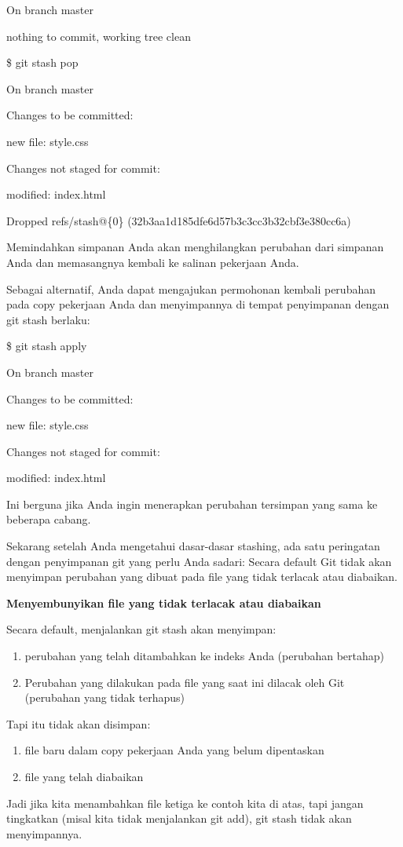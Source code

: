 On branch master

nothing to commit, working tree clean

\$ git stash pop

On branch master

Changes to be committed:

new file: style.css

Changes not staged for commit:

modified: index.html

Dropped refs/stash@\{0\} (32b3aa1d185dfe6d57b3c3cc3b32cbf3e380cc6a)

Memindahkan simpanan Anda akan menghilangkan perubahan dari simpanan 
Anda dan memasangnya kembali ke salinan pekerjaan Anda.



Sebagai alternatif, Anda dapat mengajukan permohonan kembali perubahan 
pada copy pekerjaan Anda dan menyimpannya di tempat penyimpanan dengan 
git stash berlaku:

\$ git stash apply

On branch master

Changes to be committed:

new file: style.css

Changes not staged for commit:

modified: index.html

Ini berguna jika Anda ingin menerapkan perubahan tersimpan yang sama ke 
beberapa cabang.

Sekarang setelah Anda mengetahui dasar-dasar stashing, ada satu 
peringatan dengan penyimpanan git yang perlu Anda sadari: Secara default 
Git tidak akan menyimpan perubahan yang dibuat pada file yang tidak 
terlacak atau diabaikan.

\textbf{Menyembunyikan file yang tidak terlacak atau diabaikan}

Secara default, menjalankan git stash akan menyimpan:

\begin{enumerate}
\item perubahan yang telah ditambahkan ke indeks Anda (perubahan 
bertahap)
\item Perubahan yang dilakukan pada file yang saat ini dilacak oleh Git 
(perubahan yang tidak terhapus)
\setcounter{numberedCntA}{\theenumi}
\end{enumerate}
Tapi itu tidak akan disimpan:

\begin{enumerate}
\item file baru dalam copy pekerjaan Anda yang belum dipentaskan
\item file yang telah diabaikan
\setcounter{numberedCntB}{\theenumi}
\end{enumerate}
Jadi jika kita menambahkan file ketiga ke contoh kita di atas, tapi 
jangan tingkatkan (misal kita tidak menjalankan git add), git stash 
tidak akan menyimpannya.\vspace{12pt} 

